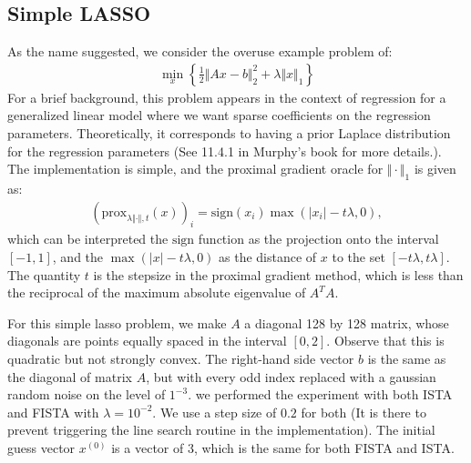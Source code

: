 \documentclass[]{article}
\theoremstyle{definition}
\begin{document}
    \subsection*{Simple LASSO}
        As the name suggested, we consider the overuse example problem of: 
        \begin{align*}
            \min_{x}\left\lbrace
                \frac{1}{2}\Vert Ax - b\Vert^2_2 + \lambda\Vert x\Vert_1    
            \right\rbrace
        \end{align*}
        For a brief background, this problem appears in the context of regression for a generalized linear model where we want sparse coefficients on the regression parameters. Theoretically, it corresponds to having a prior Laplace distribution for the regression parameters (See 11.4.1 in Murphy's\cite{book:ml_prob_murphy} book for more details.). The implementation is simple, and the proximal gradient oracle for $\Vert \cdot \Vert_1$ is given as: 
        \begin{align*}
           (\text{prox}_{\lambda\Vert \cdot \Vert, t}(x))_i
           = 
           \text{sign}(x_i)\max(|x_i| - t\lambda, 0), 
        \end{align*}
        which can be interpreted the $\text{sign}$ function as the projection onto the interval $[-1, 1]$, and the $\max(|x| - t\lambda, 0)$ as the distance of $x$ to the set $[-t\lambda, t\lambda]$. The quantity $t$ is the stepsize in the proximal gradient method, which is less than the reciprocal of the maximum absolute eigenvalue of $A^TA$. 
        \par
        For this simple lasso problem, we make $A$ a diagonal 128 by 128 matrix, whose diagonals are points equally spaced in the interval $[0, 2]$. Observe that this is quadratic but not strongly convex. The right-hand side vector $b$ is the same as the diagonal of matrix $A$, but with every odd index replaced with a gaussian random noise on the level of $1^{-3}$. we performed the experiment with both ISTA and FISTA with $\lambda = 10^{-2}$. We use a step size of $0.2$ for both (It is there to prevent triggering the line search routine in the implementation). The initial guess vector $x^{(0)}$ is a vector of 3, which is the same for both FISTA and ISTA. 
        \par
\end{document}
